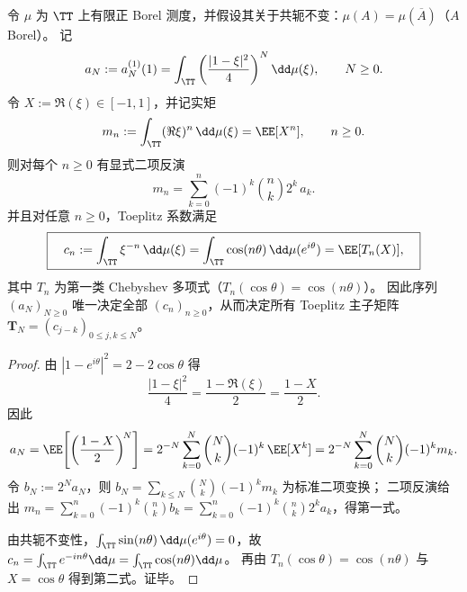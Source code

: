 \begin{theorem}\label{thm:xi-selfdual-single-probe-determines-toeplitz-moments}
令 \(\mu\) 为 \(\TT\) 上有限正 Borel 测度，并假设其关于共轭不变：\(\mu(A)=\mu(\overline A)\)（\(A\) Borel）。
记
\[
a_N:=a_N^{(1)}(1)=\int_{\TT}\left(\frac{|1-\xi|^2}{4}\right)^{N}\dd\mu(\xi),\qquad N\ge 0.
\]
令 \(X:=\Re(\xi)\in[-1,1]\)，并记实矩
\[
m_n:=\int_{\TT}(\Re\xi)^n\,\dd\mu(\xi)=\EE[X^n],\qquad n\ge 0.
\]
则对每个 \(n\ge 0\) 有显式二项反演
\[
\boxed{\quad
m_n=\sum_{k=0}^{n}(-1)^k\binom{n}{k}2^k\,a_k.\quad}
\]
并且对任意 \(n\ge 0\)，Toeplitz 系数满足
\[
\boxed{\quad
c_n:=\int_{\TT}\xi^{-n}\,\dd\mu(\xi)=\int_{\TT}\cos(n\theta)\,\dd\mu(e^{i\theta})
=\EE[T_n(X)],\quad}
\]
其中 \(T_n\) 为第一类 Chebyshev 多项式（\(T_n(\cos\theta)=\cos(n\theta)\)）。
因此序列 \((a_N)_{N\ge 0}\) 唯一决定全部 \((c_n)_{n\ge 0}\)，从而决定所有 Toeplitz 主子矩阵 \(\mathbf{T}_N=(c_{j-k})_{0\le j,k\le N}\)。
\end{theorem}
\begin{proof}
由 \(|1-e^{i\theta}|^2=2-2\cos\theta\) 得
\[
\frac{|1-\xi|^2}{4}=\frac{1-\Re(\xi)}{2}=\frac{1-X}{2}.
\]
因此
\[
a_N=\EE\!\left[\left(\frac{1-X}{2}\right)^{\!N}\right]
=2^{-N}\sum_{k=0}^{N}\binom{N}{k}(-1)^k\,\EE[X^k]
=2^{-N}\sum_{k=0}^{N}\binom{N}{k}(-1)^k m_k.
\]
令 \(b_N:=2^{N}a_N\)，则 \(b_N=\sum_{k\le N}\binom{N}{k}(-1)^k m_k\) 为标准二项变换；
二项反演给出
\(
m_n=\sum_{k=0}^{n}(-1)^k\binom{n}{k}b_k
=\sum_{k=0}^{n}(-1)^k\binom{n}{k}2^k a_k
\)，得第一式。
\par
由共轭不变性，\(\int_{\TT}\sin(n\theta)\,\dd\mu(e^{i\theta})=0\)，故
\(
c_n=\int_{\TT}e^{-in\theta}\dd\mu=\int_{\TT}\cos(n\theta)\dd\mu
\)。
再由 \(T_n(\cos\theta)=\cos(n\theta)\) 与 \(X=\cos\theta\) 得到第二式。证毕。
\end{proof}

